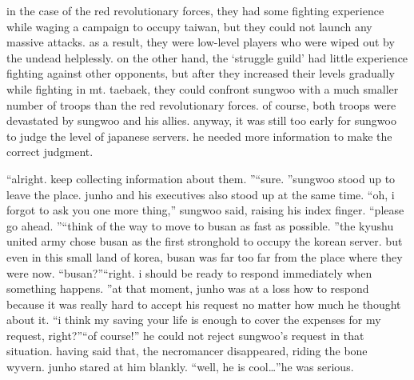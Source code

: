 in the case of the red revolutionary forces, they had some fighting experience while waging a campaign to occupy taiwan, but they could not launch any massive attacks.
 as a result, they were low-level players who were wiped out by the undead helplessly.
on the other hand, the ‘struggle guild’ had little experience fighting against other opponents, but after they increased their levels gradually while fighting in mt.
 taebaek, they could confront sungwoo with a much smaller number of troops than the red revolutionary forces.
of course, both troops were devastated by sungwoo and his allies.
anyway, it was still too early for sungwoo to judge the level of japanese servers.
he needed more information to make the correct judgment.


“alright.
 keep collecting information about them.
”“sure.
”sungwoo stood up to leave the place.
 junho and his executives also stood up at the same time.
“oh, i forgot to ask you one more thing,” sungwoo said, raising his index finger.
“please go ahead.
”“think of the way to move to busan as fast as possible.
”the kyushu united army chose busan as the first stronghold to occupy the korean server.
but even in this small land of korea, busan was far too far from the place where they were now.
“busan?”“right.
 i should be ready to respond immediately when something happens.
”at that moment, junho was at a loss how to respond because it was really hard to accept his request no matter how much he thought about it.
“i think my saving your life is enough to cover the expenses for my request, right?”“of course!” he could not reject sungwoo’s request in that situation.
having said that, the necromancer disappeared, riding the bone wyvern.
junho stared at him blankly.
“well, he is cool…”he was serious.


 